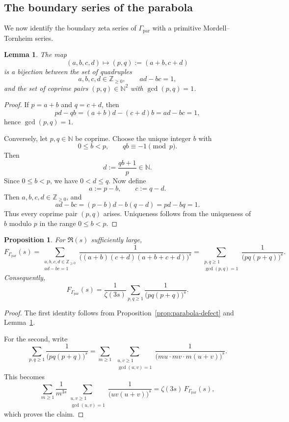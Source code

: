 \documentclass[a4paper,american,11pt]{amsart}
\theoremstyle{plain}
\newtheorem{proposition}[theorem]{Proposition}
\newtheorem{lemma}[theorem]{Lemma}
\theoremstyle{definition}
\newcommand{\N}{\mathbb N}
\newcommand{\Z}{\mathbb Z}
\begin{document}
\subsection{The boundary series of the parabola}

We now identify the boundary zeta series of \(\Gamma_{\mathrm{par}}\) with a
primitive Mordell--Tornheim series.

\begin{lemma}\label{lem:parabola-bijection}
The map
\[
(a,b,c,d)\longmapsto (p,q):=(a+b,c+d)
\]
is a bijection between the set of quadruples
\[
a,b,c,d\in \Z_{\ge0},
\qquad
ad-bc=1,
\]
and the set of coprime pairs \((p,q)\in\N^2\) with \(\gcd(p,q)=1\).
\end{lemma}

\begin{proof}
If \(p=a+b\) and \(q=c+d\), then
\[
pd-qb=(a+b)d-(c+d)b=ad-bc=1,
\]
hence \(\gcd(p,q)=1\).

Conversely, let \(p,q\in\N\) be coprime. Choose the unique integer \(b\) with
\[
0\le b<p,
\qquad
qb\equiv -1 \pmod p.
\]
Then
\[
d:=\frac{qb+1}{p}\in\N.
\]
Since \(0\le b<p\), we have \(0<d\le q\). Now define
\[
a:=p-b,
\qquad
c:=q-d.
\]
Then \(a,b,c,d\in \Z_{\ge0}\), and
\[
ad-bc=(p-b)d-b(q-d)=pd-bq=1.
\]
Thus every coprime pair \((p,q)\) arises. Uniqueness follows from the
uniqueness of \(b\) modulo \(p\) in the range \(0\le b<p\).
\end{proof}

\begin{proposition}\label{prop:parabola-boundary-series}
For \(\Re(s)\) sufficiently large,
\[
F_{\Gamma_{\mathrm{par}}}(s)
=
\sum_{\substack{a,b,c,d\in\Z_{\ge0}\\ ad-bc=1}}
\frac{1}{\bigl((a+b)(c+d)(a+b+c+d)\bigr)^s}
=
\sum_{\substack{p,q\ge1\\ \gcd(p,q)=1}}
\frac{1}{\bigl(pq(p+q)\bigr)^s}.
\]
Consequently,
\[
F_{\Gamma_{\mathrm{par}}}(s)
=
\frac{1}{\zeta(3s)}
\sum_{p,q\ge1}\frac{1}{\bigl(pq(p+q)\bigr)^s}.
\]
\end{proposition}

\begin{proof}
The first identity follows from Proposition~\ref{prop:parabola-defect} and
Lemma~\ref{lem:parabola-bijection}.

For the second, write
\[
\sum_{p,q\ge1}\frac{1}{\bigl(pq(p+q)\bigr)^s}
=
\sum_{m\ge1}\ 
\sum_{\substack{u,v\ge1\\ \gcd(u,v)=1}}
\frac{1}{\bigl(mu\cdot mv\cdot m(u+v)\bigr)^s}.
\]
This becomes
\[
\sum_{m\ge1}\frac{1}{m^{3s}}
\sum_{\substack{u,v\ge1\\ \gcd(u,v)=1}}
\frac{1}{\bigl(uv(u+v)\bigr)^s}
=
\zeta(3s)\,F_{\Gamma_{\mathrm{par}}}(s),
\]
which proves the claim.
\end{proof}
\end{document}
